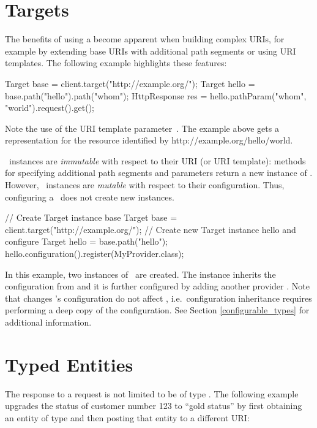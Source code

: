 \section{Targets}

The benefits of using a  become apparent when building complex URIs, for example by extending base URIs with additional path segments or using URI templates. The following example highlights these features:

\begin{listing}{1}
Target base = client.target("http://example.org/");
Target hello = base.path("hello").path("{whom}");   
HttpResponse res = hello.pathParam("whom", "world").request().get();
\end{listing}

Note the use of the URI template parameter~. The example above gets a representation for the resource identified by http://example.org/hello/world.

\Target\ instances are {\em immutable} with respect to their URI (or URI template): methods for specifying additional path segments and parameters return a new instance of \Target. However, \Target\ instances are {\em mutable} with respect to their configuration. Thus, configuring a \Target\ does not create new instances.

\begin{listing}{1}
// Create Target instance base
Target base = client.target("http://example.org/");
// Create new Target instance hello and configure
Target hello = base.path("hello");
hello.configuration().register(MyProvider.class);
\end{listing}

In this example, two instances of \Target\ are created. The instance  inherits the configuration from  and it is further configured by adding another provider . Note that changes 's configuration do not affect , i.e.~configuration inheritance requires performing a deep copy of the configuration. See Section \ref{configurable_types} for additional information.

\section{Typed Entities}

The response to a request is not limited to be of type \HttpResponse. The following example upgrades the status of customer number 123 to ``gold status'' by first obtaining an entity of type  and then posting that entity to a different URI:

